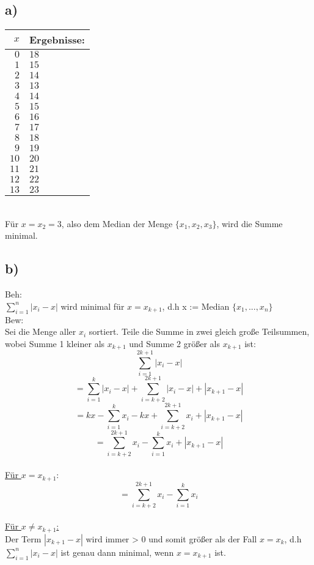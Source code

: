 \documentclass[a4paper,11pt,twoside]{article}
\begin{document}
\subsection*{a)}
\begin{tabular}{r|l}
	$x$ & Ergebnisse: \\ \hline
	$0$&$18$\\
	$1$&$15$\\
	$2$&$14$\\
	$3$&$13$\\
	$4$&$14$\\
	$5$&$15$\\
	$6$&$16$\\
	$7$&$17$\\
	$8$&$18$\\
	$9$&$19$\\
	$10$&$20$\\
	$11$&$21$\\
	$12$&$22$\\
	$13$&$23$
\end{tabular} \\

Für $x=x_2=3$, also dem Median der Menge $\{x_1, x_2, x_3\}$, wird die Summe minimal.


\subsection*{b)}

Beh:\\ $\sum_{i=1}^{n} |x_i-x|$ wird minimal für $x = x_{k+1}$, d.h x := Median $\{x_1, ..., x_n\}$\\

Bew: \\
Sei die Menge aller $x_i$ sortiert. Teile die Summe in zwei gleich große Teilsummen, wobei Summe 1 kleiner als $x_{k+1}$ und Summe 2 größer als $x_{k+1} $ ist:
\[\sum_{i=1}^{2k+1}|x_i-x|\]
\[= \sum_{i=1}^{k}|x_i-x| + \sum_{i=k+2}^{2k+1}|x_i-x| + |x_{k+1}-x|\]
\[= kx - \sum_{i=1}^{k}x_i -kx+ \sum_{i=k+2}^{2k+1}x_i + |x_{k+1}-x|\]
\[= \sum_{i=k+2}^{2k+1}x_i - \sum_{i=1}^{k}x_i + |x_{k+1}-x|\]\\

\underline{Für $x=x_{k+1}$}:
\[= \sum_{i=k+2}^{2k+1}x_i - \sum_{i=1}^{k}x_i \] \\

\underline{Für $x \neq x_{k+1}$:}\\
Der Term  $|x_{k+1}-x|$ wird immer > 0 und somit größer als der Fall $x=x_k$, d.h  $\sum_{i=1}^{n} |x_i-x|$ ist genau dann minimal, wenn $x = x_{k+1}$ ist.
\end{document}

